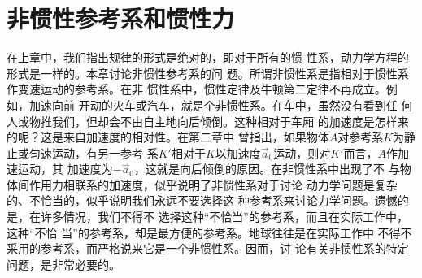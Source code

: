 \section{非惯性参考系和惯性力}\label{sec:12.01}

在上章中，我们指出规律的形式是绝对的，即对于所有的惯
性系，动力学方程的形式是一样的。本章讨论非惯性参考系的问
题。所谓非惯性系是指相对于惯性系作变速运动的参考系。在非
惯性系中，惯性定律及牛顿第二定律不再成立。例如，加速向前
开动的火车或汽车，就是个非惯性系。在车中，虽然没有看到任
何人或物推我们，但却会不由自主地向后倾倒。这种相对于车厢
的加速度是怎样来的呢？这是来自加速度的相对性。在第二章中
曾指出，如果物体$ A $对参考系$ K $为静止或匀速运动，有另一参考
系$ K' $相对于$ K $以加速度$ \vec{a}_0 $运动，则对$ K ' $而言，$ A $作加速运动，其
加速度为$ - \vec{a} _ { 0 } $，这就是向后倾倒的原因。在非惯性系中出现了不
与物体间作用力相联系的加速度，似乎说明了非惯性系对于讨论
动力学问题是复杂的、不恰当的，似乎说明我们永远不要选择这
种参考系来讨论力学问题。遗憾的是，在许多情况，我们不得不
选择这种“不恰当”的参考系，而且在实际工作中，这种“不恰
当”的参考系，却是最方便的参考系。地球往往是在实际工作中
不得不采用的参考系，而严格说来它是一个非惯性系。因而，讨
论有关非惯性系的特定问题，是非常必要的。

